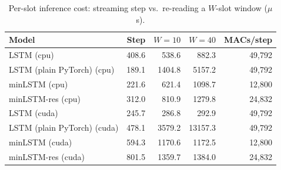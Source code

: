 \begin{table}[t]
\centering
\caption{Per-slot inference cost: streaming step vs.\ re-reading a $W$-slot window ($\mu$s).}\label{tab:compute}
\begin{tabular}{lrrrr}
\toprule
Model & Step & $W{=}10$ & $W{=}40$ & MACs/step \\
\midrule
LSTM (cpu) & 408.6 & 538.6 & 882.3 & 49,792 \\
LSTM (plain PyTorch) (cpu) & 189.1 & 1404.8 & 5157.2 & 49,792 \\
minLSTM (cpu) & 221.6 & 621.4 & 1098.7 & 12,800 \\
minLSTM-res (cpu) & 312.0 & 810.9 & 1279.8 & 24,832 \\
LSTM (cuda) & 245.7 & 286.8 & 292.9 & 49,792 \\
LSTM (plain PyTorch) (cuda) & 478.1 & 3579.2 & 13157.3 & 49,792 \\
minLSTM (cuda) & 594.3 & 1170.6 & 1172.5 & 12,800 \\
minLSTM-res (cuda) & 801.5 & 1359.7 & 1384.0 & 24,832 \\
\bottomrule
\end{tabular}
\end{table}
